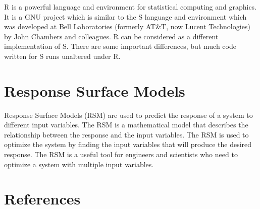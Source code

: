 \documentclass[
  letterpaper,
  DIV=11,
  numbers=noendperiod]{scrreprt}
\newlength{\cslhangindent}
\newenvironment{CSLReferences}[2] %
 {\begin{list}{}{%
  \setlength{\itemindent}{0pt}
  \setlength{\leftmargin}{0pt}
  \setlength{\parsep}{0pt}
  \ifodd #1
   \setlength{\leftmargin}{\cslhangindent}
   \setlength{\itemindent}{-1\cslhangindent}
  \fi
  \setlength{\itemsep}{#2\baselineskip}}}
 {\end{list}}
\begin{document}
R is a powerful language and environment for statistical computing and
graphics. It is a GNU project which is similar to the S language and
environment which was developed at Bell Laboratories (formerly AT\&T,
now Lucent Technologies) by John Chambers and colleagues. R can be
considered as a different implementation of S. There are some important
differences, but much code written for S runs unaltered under R.


\chapter{Response Surface Models}\label{response-surface-models}

Response Surface Models (RSM) are used to predict the response of a
system to different input variables. The RSM is a mathematical model
that describes the relationship between the response and the input
variables. The RSM is used to optimize the system by finding the input
variables that will produce the desired response. The RSM is a useful
tool for engineers and scientists who need to optimize a system with
multiple input variables.


\chapter*{References}\label{references}


\label{refs}
\begin{CSLReferences}{0}{1}
\end{CSLReferences}
\end{document}
